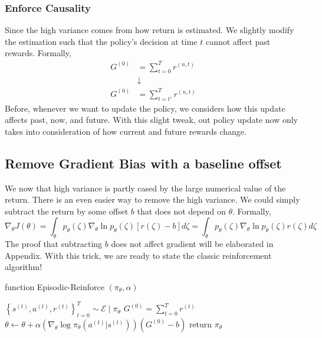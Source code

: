 \documentclass[11pt]{article}
\begin{document}
\subsubsection{Enforce Causality}
Since the high variance comes from how return is estimated. We slightly modify the estimation such that the policy's decision at time $t$ cannot affect past rewards. Formally, 
\begin{align*}
    G^{(0)} &= \sum_{t=0}^{T} r^{(n, t)} \\
    &\downarrow \\
    G^{(0)} &= \sum_{t=t'}^{T} r^{(n, t)} 
\end{align*}
Before, whenever we want to update the policy, we considers how this update affects past, now, and future. With this slight tweak, out policy update now only takes into consideration of how current and future rewards change.

\subsection{Remove Gradient Bias with a baseline offset}
We now that high variance is partly cased by the large numerical value of the return. There is an even easier way to remove the high variance. We could simply subtract the return by some offset $b$ that does not depend on $\theta$. Formally, 
$$\nabla_{\theta} J(\theta)=\int_{\theta} p_{\theta}(\zeta) \nabla_{\theta} \ln p_{\theta}(\zeta)[r(\zeta)-b] d \zeta=\int_{\theta} p_{\theta}(\zeta) \nabla_{\theta} \ln p_{\theta}(\zeta) r(\zeta) d \zeta$$
The proof that subtracting $b$ does not affect gradient will be elaborated in Appendix. With this trick, we are ready to state the classic reinforcement algorithm! 
\begin{algorithm}
\caption{function Episodic-Reinforce $\left(\pi_{\theta}, \alpha\right)$}\label{alg:cap}
\begin{algorithmic}
\STATE $\left\{s^{(t)}, a^{(t)}, r^{(t)}\right\}_{t=0}^{T} \sim \mathcal{E} \mid \pi_{\theta}$
\STATE $G^{(0)}=\sum_{t=0}^{T} r^{(t)}$
\STATE $\theta \leftarrow \theta+\alpha\left(\nabla_{\theta} \log \pi_{\theta}\left(a^{(t)} | s^{(t)}\right)\right)\left(G^{(0)} - b\right)$
\ENDFOR
\ENDFOR
\STATE return $\pi_{\theta}$
\end{algorithmic}
\end{algorithm}
\end{document}
